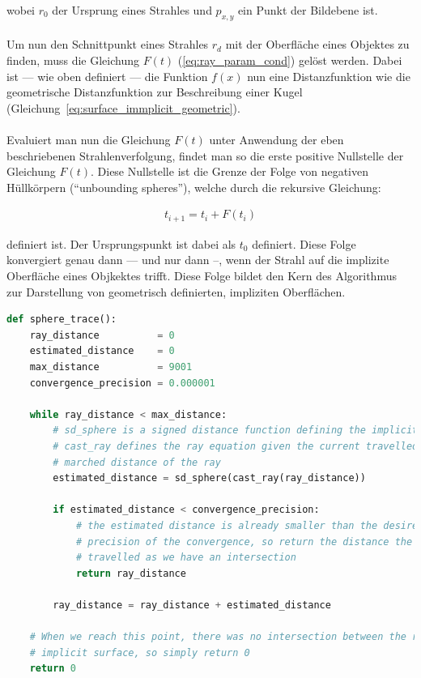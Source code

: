 wobei $r_{0}$ der Ursprung eines Strahles und $p_{x, y}$ ein Punkt der Bildebene ist.\\
\\
Um nun den Schnittpunkt eines Strahles $r_{d}$ mit der Oberfläche eines
Objektes zu finden, muss die Gleichung $F(t)$ (\ref{eq:ray_param_cond}) gelöst
werden. Dabei ist --- wie oben definiert --- die Funktion $f(x)$ nun eine
Distanzfunktion wie die geometrische Distanzfunktion zur Beschreibung einer
Kugel (Gleichung~\ref{eq:surface_immplicit_geometric}).\\
\\
Evaluiert man nun die Gleichung $F(t)$ unter Anwendung der eben beschriebenen
Strahlenverfolgung, findet man so die erste positive Nullstelle der Gleichung
$F(t)$. Diese Nullstelle ist die Grenze der Folge von negativen Hüllkörpern
(``unbounding spheres''), welche durch die rekursive Gleichung:

\begin{gather}
    t_{i+1} = t_{i} + F(t_{i})
\end{gather}

definiert ist. Der Ursprungspunkt ist dabei als $t_{0}$ definiert. Diese Folge
konvergiert genau dann --- und nur dann --, wenn der Strahl auf die implizite
Oberfläche eines Objkektes trifft. Diese Folge bildet den Kern des Algorithmus
zur Darstellung von geometrisch definierten, impliziten Oberflächen.

\begin{lstlisting}[language=Python,caption={Eine abstrakte Umsetzung des Sphere
        Tracings\protect\footnotemark.},label={alg:sphere_tracing},captionpos=b,emph={sphere_trace}]
def sphere_trace():
    ray_distance          = 0
    estimated_distance    = 0
    max_distance          = 9001
    convergence_precision = 0.000001

    while ray_distance < max_distance:
        # sd_sphere is a signed distance function defining the implicit surface
        # cast_ray defines the ray equation given the current travelled /
        # marched distance of the ray
        estimated_distance = sd_sphere(cast_ray(ray_distance))

        if estimated_distance < convergence_precision:
            # the estimated distance is already smaller than the desired
            # precision of the convergence, so return the distance the ray has
            # travelled as we have an intersection
            return ray_distance

        ray_distance = ray_distance + estimated_distance

    # When we reach this point, there was no intersection between the ray and a
    # implicit surface, so simply return 0
    return 0
\end{lstlisting}

